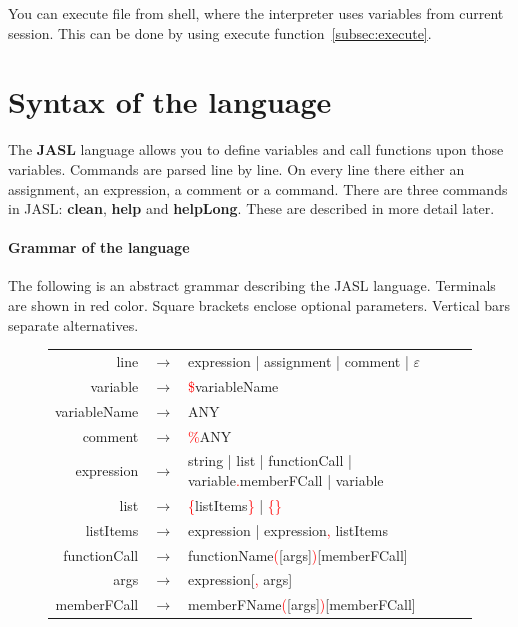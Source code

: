 \documentclass{ctuthesis}
\begin{document}
You can execute file from shell, where the interpreter uses variables from current session. This can be done by using execute function~\ref{subsec:execute}. 

\section{Syntax of the language}
\label{subsec:syntax}
The \textbf{JASL} language allows you to define variables and call functions upon those variables. Commands are parsed line by line. On every line there either an assignment, an expression, a comment or a command. There are three commands in JASL: \textbf{clean}, \textbf{help} and \textbf{helpLong}. These are described in more detail later.

\paragraph{Grammar of the language} The following is an abstract grammar describing the JASL language. Terminals are shown in red color. Square brackets enclose optional parameters. Vertical bars separate alternatives.

\begin{figure}[H]
\begin{ctucolortab}
\begin{tabular}{rcl}
	line &$\rightarrow$& expression | assignment | comment | $\varepsilon$ \\
	variable &$\rightarrow$& \textcolor{red}{\$}variableName\\
	variableName &$\rightarrow$& ANY \\
	comment &$\rightarrow$& \textcolor{red}{\%}ANY \\
	expression &$\rightarrow$& string | list | functionCall | variable\textcolor{red}{.}memberFCall | variable \\
	list &$\rightarrow$& \textcolor{red}{\{}listItems\textcolor{red}{\}} | \textcolor{red}{\{}\textcolor{red}{\}} \\
	listItems &$\rightarrow$& expression | expression\textcolor{red}{,} listItems \\
	functionCall &$\rightarrow$& functionName\textcolor{red}{(}[args]\textcolor{red}{)}[memberFCall] \\
	args &$\rightarrow$& expression[\textcolor{red}{,} args] \\
	memberFCall &$\rightarrow$& memberFName\textcolor{red}{(}[args]\textcolor{red}{)}[memberFCall]
\end{tabular}
\end{ctucolortab}
\end{figure}
\end{document}
